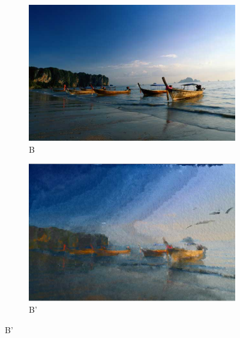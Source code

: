 \documentclass{article}
\begin{document}
\begin{figure}[!ht]
\begin{subfigure}{0.5\textwidth}
\centering
\includegraphics[width=0.75\linewidth]{boats.jpg}
\caption{B}
\end{subfigure}
\begin{subfigure}{0.5\textwidth}
\centering
\includegraphics[width=0.75\linewidth]{B_prime.jpg}
\caption{B'}
\end{subfigure}
\end{figure}
\end{document}
